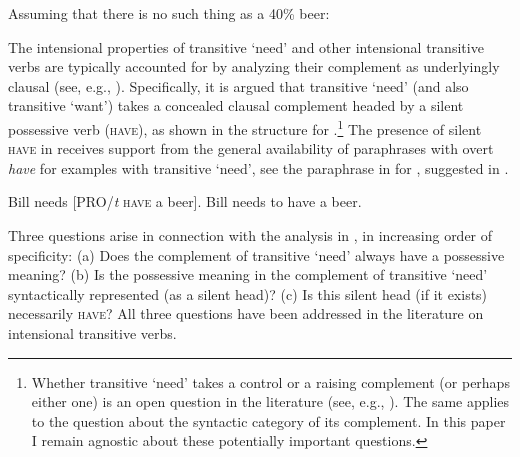\documentclass[output=paper,colorlinks,citecolor=brown]{langscibook}
\begin{document}
\ea Assuming that there is no such thing as a 40\% beer:\\
\label{need-non-referring}
\label{need-non-referring-infinitival}
\label{non-referring-non-intensional}
\z\z

\noindent The intensional properties of transitive `need' and other intensional transitive verbs are typically accounted for by analyzing their complement as underlyingly clausal (see, e.g., \citealt{denDikken.Larson.Ludlow2018,Harves2008}). Specifically, it is argued that transitive `need' (and also transitive `want') takes a concealed clausal complement headed by a silent possessive verb (\textsc{have}), as shown in the structure  for .\footnote{Whether transitive `need' takes a control or a raising complement (or perhaps either one) is an open question in the literature (see, e.g., \citealt{Schwarz2006,Harves2008}). The same applies to the question about the syntactic category of its complement. In this paper I remain agnostic about these potentially important questions.} The presence of silent \textsc{have} in  receives support from the general availability of paraphrases with overt \textit{have} for examples with transitive `need', see the paraphrase in  for , suggested in \citet[259]{Schwarz2006}.

\ea \label{have}
\ea Bill needs [PRO/\textit{t} \textsc{have} a beer].\label{need-have-structure}
\ex Bill needs to have a beer.\label{need-have-infinitival}
\z \z

\noindent Three questions arise in connection with the analysis in , in increasing order of specificity: (a) Does the complement of transitive `need' always have a possessive meaning? (b) Is the possessive meaning in the complement of transitive `need' syntactically represented (as a silent head)? (c) Is this silent head (if it exists) necessarily \textsc{have}? All three questions have been addressed in the literature on intensional transitive verbs.
\end{document}
